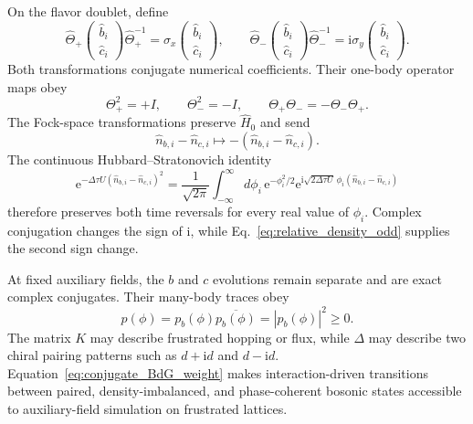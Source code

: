 \documentclass[onecolumn,aps,prb,amsmath,amssymb,superscriptaddress,longbibliography]{revtex4-2}
\newcommand{\ee}{\mathrm{e}}
\newcommand{\ii}{\mathrm{i}}
\begin{document}
On the flavor doublet, define
\begin{equation}
    \widehat\Theta_+
    \begin{pmatrix}\hat b_i\\\hat c_i\end{pmatrix}
    \widehat\Theta_+^{-1}
    =\sigma_x\begin{pmatrix}\hat b_i\\\hat c_i\end{pmatrix},
    \qquad
    \widehat\Theta_-
    \begin{pmatrix}\hat b_i\\\hat c_i\end{pmatrix}
    \widehat\Theta_-^{-1}
    =\ii\sigma_y\begin{pmatrix}\hat b_i\\\hat c_i\end{pmatrix}.
    \label{eq:conjugate_BdG_TR}
\end{equation}
Both transformations conjugate numerical coefficients.  Their one-body operator maps obey
\begin{equation}
    \Theta_+^2=+I,
    \qquad
    \Theta_-^2=-I,
    \qquad
    \Theta_+\Theta_-=-\Theta_-\Theta_+.
    \label{eq:conjugate_BdG_TR_algebra}
\end{equation}
The Fock-space transformations preserve \(\hat H_0\) and send
\begin{equation}
    \hat n_{b,i}-\hat n_{c,i}
    \longmapsto
    -(\hat n_{b,i}-\hat n_{c,i}).
    \label{eq:relative_density_odd}
\end{equation}
The continuous Hubbard--Stratonovich identity
\begin{equation}
    \ee^{-\Delta\tau U(\hat n_{b,i}-\hat n_{c,i})^2}
    =\frac{1}{\sqrt{2\pi}}
    \int_{-\infty}^{\infty}d\phi_i\,\ee^{-\phi_i^2/2}
    \ee^{\ii\sqrt{2\Delta\tau U}\,\phi_i
      (\hat n_{b,i}-\hat n_{c,i})}
    \label{eq:relative_density_HS}
\end{equation}
therefore preserves both time reversals for every real value of \(\phi_i\).  Complex conjugation changes the sign of \(\ii\), while Eq.~\eqref{eq:relative_density_odd} supplies the second sign change.

At fixed auxiliary fields, the \(b\) and \(c\) evolutions remain separate and are exact complex conjugates.  Their many-body traces obey
\begin{equation}
    p(\phi)=p_b(\phi)\overline{p_b(\phi)}
    =|p_b(\phi)|^2\geq0.
    \label{eq:conjugate_BdG_weight}
\end{equation}
The matrix \(K\) may describe frustrated hopping or flux, while \(\Delta\) may describe two chiral pairing patterns such as \(d+\ii d\) and \(d-\ii d\).  Equation~\eqref{eq:conjugate_BdG_weight} makes interaction-driven transitions between paired, density-imbalanced, and phase-coherent bosonic states accessible to auxiliary-field simulation on frustrated lattices.
\end{document}
